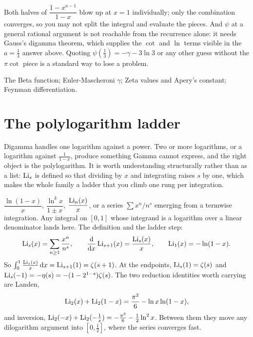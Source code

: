\begin{trap}
Both halves of $\dfrac{1-x^{a-1}}{1-x}$ blow up at $x=1$ individually; only the combination converges, so you may not split the integral and evaluate the pieces. And $\psi$ at a general rational argument is not reachable from the recurrence alone: it needs Gauss's digamma theorem, which supplies the $\cot$ and $\ln$ terms visible in the $a=\tfrac13$ answer above. Quoting $\psi(\tfrac13)=-\gamma-3\ln3$ or any other guess without the $\pi\cot$ piece is a standard way to lose a problem.
\end{trap}

\begin{seealsob}The Beta function; Euler-Mascheroni $\gamma$; Zeta values and Apery's constant; Feynman differentiation.\end{seealsob}

\section{The polylogarithm ladder}

Digamma handles one logarithm against a power. Two or more logarithms, or a logarithm against $\tfrac{1}{1-x}$, produce something Gamma cannot express, and the right object is the polylogarithm. It is worth understanding structurally rather than as a list: $\operatorname{Li}_s$ is defined so that dividing by $x$ and integrating raises $s$ by one, which makes the whole family a ladder that you climb one rung per integration.

\cue $\dfrac{\ln(1-x)}{x}$, $\dfrac{\ln^{k}x}{1\pm x}$, $\dfrac{\operatorname{Li}_n(x)}{x}$, or a series $\sum x^{n}/n^{s}$ emerging from a termwise integration. Any integral on $[0,1]$ whose integrand is a logarithm over a linear denominator lands here.
\method The definition and the ladder step:
\[\operatorname{Li}_s(x)=\sum_{n\geq1}\frac{x^{n}}{n^{s}},\qquad \frac{\mathrm{d}}{\mathrm{d}x}\operatorname{Li}_{s+1}(x)=\frac{\operatorname{Li}_s(x)}{x},\qquad \operatorname{Li}_1(x)=-\ln(1-x).\]
So $\int_0^1\frac{\operatorname{Li}_s(x)}{x}\,\mathrm{d} x=\operatorname{Li}_{s+1}(1)=\zeta(s+1)$. At the endpoints, $\operatorname{Li}_s(1)=\zeta(s)$ and $\operatorname{Li}_s(-1)=-\eta(s)=-(1-2^{1-s})\zeta(s)$. The two reduction identities worth carrying are Landen,
\[\operatorname{Li}_2(x)+\operatorname{Li}_2(1-x)=\frac{\pi^{2}}{6}-\ln x\ln(1-x),\]
and inversion, $\operatorname{Li}_2(-x)+\operatorname{Li}_2(-\tfrac1x)=-\tfrac{\pi^{2}}{6}-\tfrac12\ln^{2}x$. Between them they move any dilogarithm argument into $[0,\tfrac12]$, where the series converges fast.

